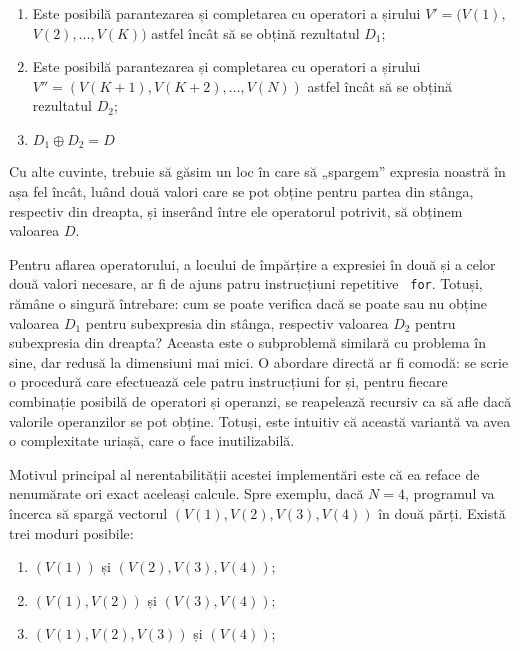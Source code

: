 \begin{enumerate}

\item Este posibilă parantezarea și completarea cu operatori a șirului $V' =
  (V(1),$ $V(2), \dots, V(K))$ astfel încât să se obțină rezultatul $D_1$;

\item Este posibilă parantezarea și completarea cu operatori a șirului
  $V''=(V(K+1), V(K+2), \dots, V(N))$ astfel încât să se obțină rezultatul
  $D_2$;

\item $D_1 \oplus D_2 = D$

\end{enumerate}

Cu alte cuvinte, trebuie să găsim un loc în care să „spargem” expresia noastră
în așa fel încât, luând două valori care se pot obține pentru partea din
stânga, respectiv din dreapta, și inserând între ele operatorul potrivit, să
obținem valoarea $D$.

Pentru aflarea operatorului, a locului de împărțire a expresiei în două și a
celor două valori necesare, ar fi de ajuns patru instrucțiuni repetitive {\tt
  for}. Totuși, rămâne o singură întrebare: cum se poate verifica dacă se
poate sau nu obține valoarea $D_1$ pentru subexpresia din stânga, respectiv
valoarea $D_2$ pentru subexpresia din dreapta? Aceasta este o subproblemă
similară cu problema în sine, dar redusă la dimensiuni mai mici. O abordare
directă ar fi comodă: se scrie o procedură care efectuează cele patru
instrucțiuni for și, pentru fiecare combinație posibilă de operatori și
operanzi, se reapelează recursiv ca să afle dacă valorile operanzilor se pot
obține. Totuși, este intuitiv că această variantă va avea o complexitate
uriașă, care o face inutilizabilă.

Motivul principal al nerentabilității acestei implementări este că ea reface
de nenumărate ori exact aceleași calcule. Spre exemplu, dacă $N=4$, programul
va încerca să spargă vectorul $(V(1), V(2), V(3), V(4))$ în două părți. Există
trei moduri posibile:

\begin{enumerate}[label=(\alph*)]

\item $(V(1))$ și $(V(2), V(3), V(4))$;

\item $(V(1), V(2))$ și $(V(3), V(4))$;

\item $(V(1), V(2), V(3))$ și $(V(4))$;

\end{enumerate}


